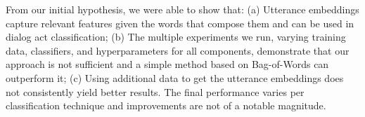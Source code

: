From our initial hypothesis, we were able to show that: (a) Utterance embeddings capture relevant features given the words that compose them and can be used in dialog act classification; (b) The multiple experiments we run, varying training data, classifiers, and hyperparameters for all components, demonstrate that our approach is not sufficient and a simple method based on Bag-of-Words can outperform it; (c) Using additional data to get the utterance embeddings does not consistently yield better results. The final performance varies per classification technique and improvements are not of a notable magnitude.
